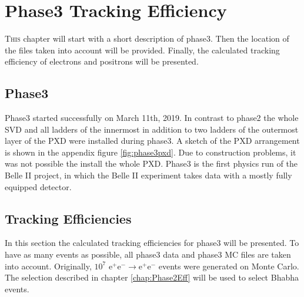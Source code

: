\documentclass[a4paper,11pt,twosided,final,german,openbib,pdftex,listof=totoc,bibliography=totoc]{scrbook}
\begin{document}
\chapter{Phase3 Tracking Efficiency}
\label{chp:TrackingEfficiencyPhase3}

\lettrine{T}{his} chapter will start with a short description of phase3. Then the location of the files taken into account will be provided. Finally, the calculated tracking efficiency of electrons and positrons will be presented.

\section{Phase3}
\label{sec:P3}

Phase3 started successfully on March 11th, 2019. In contrast to phase2 the whole SVD and all ladders of the innermost in addition to two ladders of the outermost layer of the PXD were installed during phase3. A sketch of the PXD arrangement is shown in the appendix figure \ref{fig:phase3pxd}. Due to construction problems, it was not possible the install the whole PXD. Phase3 is the first physics run of the Belle II project, in which the Belle II experiment takes data with a mostly fully equipped detector.\cite{phase3}





\section{Tracking Efficiencies}

In this section the calculated tracking efficiencies for phase3 will be presented. To have as many events as possible, all phase3 data and phase3 MC files are taken into account. Originally, $10^7$ $\textrm{e}^+\textrm{e}^- \rightarrow  \textrm{e}^+\textrm{e}^-  $ events were generated on Monte Carlo.
The selection described in chapter \ref{chap:Phase2Eff} will be used to select Bhabha events.
\end{document}
